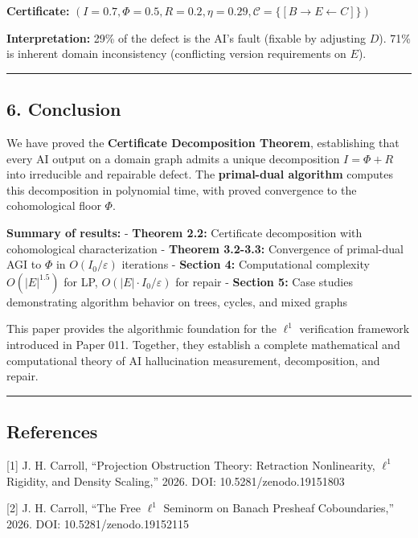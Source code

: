 \documentclass[
]{article}
\begin{document}
\textbf{Certificate:}
\((I = 0.7, \Phi = 0.5, R = 0.2, \eta = 0.29, \mathcal{C} = \{[B \to E \leftarrow C]\})\)

\textbf{Interpretation:} 29\% of the defect is the AI's fault (fixable
by adjusting \(D\)). 71\% is inherent domain inconsistency (conflicting
version requirements on \(E\)).

\begin{center}\rule{0.5\linewidth}{0.5pt}\end{center}

\subsection{6. Conclusion}\label{conclusion}

We have proved the \textbf{Certificate Decomposition Theorem},
establishing that every AI output on a domain graph admits a unique
decomposition \(I = \Phi + R\) into irreducible and repairable defect.
The \textbf{primal-dual algorithm} computes this decomposition in
polynomial time, with proved convergence to the cohomological floor
\(\Phi\).

\textbf{Summary of results:} - \textbf{Theorem 2.2:} Certificate
decomposition with cohomological characterization - \textbf{Theorem
3.2-3.3:} Convergence of primal-dual AGI to \(\Phi\) in
\(O(I_0 / \varepsilon)\) iterations - \textbf{Section 4:} Computational
complexity \(O(|E|^{1.5})\) for LP, \(O(|E| \cdot I_0 / \varepsilon)\)
for repair - \textbf{Section 5:} Case studies demonstrating algorithm
behavior on trees, cycles, and mixed graphs

This paper provides the algorithmic foundation for the \(\ell^1\)
verification framework introduced in Paper 011. Together, they establish
a complete mathematical and computational theory of AI hallucination
measurement, decomposition, and repair.

\begin{center}\rule{0.5\linewidth}{0.5pt}\end{center}

\subsection{References}\label{references}

{[}1{]} J. H. Carroll, ``Projection Obstruction Theory: Retraction
Nonlinearity, \(\ell^1\) Rigidity, and Density Scaling,'' 2026. DOI:
10.5281/zenodo.19151803

{[}2{]} J. H. Carroll, ``The Free \(\ell^1\) Seminorm on Banach Presheaf
Coboundaries,'' 2026. DOI: 10.5281/zenodo.19152115
\end{document}
